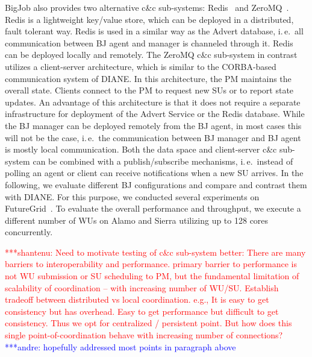 \documentclass[conference,final]{IEEEtran}
\newcommand{\jhanote}[1]{ {\textcolor{red} { ***shantenu: #1 }}}
\newcommand{\alnote}[1]{ {\textcolor{blue} { ***andre: #1 }}}
\newcommand{\alnote}[1]{}
\newcommand{\jhanote}[1]{}
\begin{document}
BigJob also provides two alternative c\&c sub-systems: Redis~\cite{redis} and ZeroMQ~\cite{zmq}. Redis is a lightweight key/value store, which can
be deployed in a distributed, fault tolerant way. Redis is used in a similar way
as the Advert database, i.\,e.\ all communication between BJ agent and manager
is channeled through it. Redis can be deployed locally and remotely. 
The ZeroMQ c\&c sub-system in contrast utilizes a client-server
architecture, which is similar to the CORBA-based~\cite{OMG-CORBA303:2004} 
communication system of DIANE. In this architecture, the PM maintains the 
overall state. Clients connect to the
PM to request new SUs or to report state updates. An advantage of this
architecture is that it does not require a separate infrastructure for
deployment of the Advert Service or the Redis database. While the BJ manager can
be deployed remotely from the BJ agent, in most cases this will not be the case,
i.\,e.\ the communication between BJ manager and BJ agent is mostly local
communication. Both the data space and client-server c\&c sub-system can be
combined with a publish/subscribe mechanisms, i.\,e.\ instead of polling an
agent or client can receive notifications when a new SU arrives. In the
following, we evaluate different BJ configurations and compare and contrast them
with DIANE. For this purpose, we conducted several experiments on
FutureGrid~\cite{fg}. To evaluate the overall performance and throughput, we
execute a different number of WUs on Alamo and Sierra
utilizing up to 128 cores concurrently. 



\jhanote{Need to motivate testing of c\&c sub-system better: There are
  many barriers to interoperability and performance. primary barrier to
  performance is not WU submission or SU scheduling to PM, but the
  fundamental limitation of scalability of coordination -- with
  increasing number of WU/SU.  Establish tradeoff between distributed
  vs local coordination. e.g., It is easy to get consistency but has
  overhead.  Easy to get performance but difficult to get
  consistency. Thus we opt for centralized / persistent point. But how
  does this single point-of-coordination behave with increasing number
  of connections? } \alnote{hopefully addressed most points in paragraph above}

\end{document}
